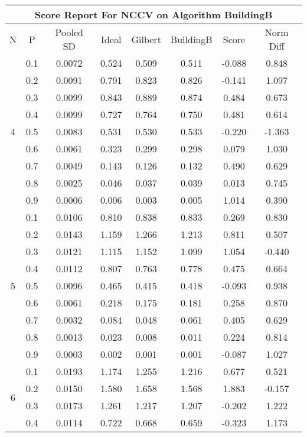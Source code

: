 \documentclass[11pt,a4paper]{report}
\begin{document}
\begin{longtable}{ | c | c || c | c | c | c | c | c | }
\hline
\multicolumn{8}{|c|}{ Score Report For NCCV on Algorithm BuildingB} \\
\hline
N & P & Pooled SD &  Ideal &  Gilbert & BuildingB  & Score & Norm Diff \\
 \hline
 \hline
 \endhead
\multirow{9}{*}{4} & 0.1 & 0.0072 & 0.524 & 0.509 & 0.511 & -0.088 & 0.848 \\
 & 0.2 & 0.0091 & 0.791 & 0.823 & 0.826 & -0.141 & 1.097 \\
 & 0.3 & 0.0099 & 0.843 & 0.889 & 0.874 & 0.484 & 0.673 \\
 & 0.4 & 0.0099 & 0.727 & 0.764 & 0.750 & 0.481 & 0.614 \\
 & 0.5 & 0.0083 & 0.531 & 0.530 & 0.533 & -0.220 & -1.363 \\
 & 0.6 & 0.0061 & 0.323 & 0.299 & 0.298 & 0.079 & 1.030 \\
 & 0.7 & 0.0049 & 0.143 & 0.126 & 0.132 & 0.490 & 0.629 \\
 & 0.8 & 0.0025 & 0.046 & 0.037 & 0.039 & 0.013 & 0.745 \\
 & 0.9 & 0.0006 & 0.006 & 0.003 & 0.005 & 1.014 & 0.390 \\
 \hline
\multirow{9}{*}{5} & 0.1 & 0.0106 & 0.810 & 0.838 & 0.833 & 0.269 & 0.830 \\
 & 0.2 & 0.0143 & 1.159 & 1.266 & 1.213 & 0.811 & 0.507 \\
 & 0.3 & 0.0121 & 1.115 & 1.152 & 1.099 & 1.054 & -0.440 \\
 & 0.4 & 0.0112 & 0.807 & 0.763 & 0.778 & 0.475 & 0.664 \\
 & 0.5 & 0.0096 & 0.465 & 0.415 & 0.418 & -0.093 & 0.938 \\
 & 0.6 & 0.0061 & 0.218 & 0.175 & 0.181 & 0.258 & 0.870 \\
 & 0.7 & 0.0032 & 0.084 & 0.048 & 0.061 & 0.405 & 0.629 \\
 & 0.8 & 0.0013 & 0.023 & 0.008 & 0.011 & 0.224 & 0.814 \\
 & 0.9 & 0.0003 & 0.002 & 0.001 & 0.001 & -0.087 & 1.027 \\
 \hline
\multirow{9}{*}{6} & 0.1 & 0.0193 & 1.174 & 1.255 & 1.216 & 0.677 & 0.521 \\
 & 0.2 & 0.0150 & 1.580 & 1.658 & 1.568 & 1.883 & -0.157 \\
 & 0.3 & 0.0173 & 1.261 & 1.217 & 1.207 & -0.202 & 1.222 \\
 & 0.4 & 0.0114 & 0.722 & 0.668 & 0.659 & -0.323 & 1.173 \\

\end{longtable}
\end{document}
